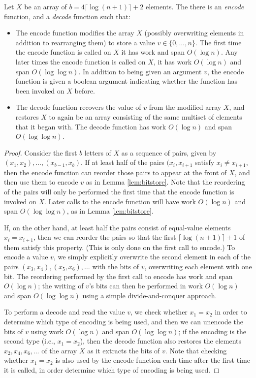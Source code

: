 \documentclass[twoside,leqno,twocolumn]{article}
\begin{document}
\begin{lemma}
Let $X$ be an array of $b = 4 \lceil \log (n + 1) \rceil + 2$
elements. The there is an \textit{encode} function, and a \textit{decode}
function such that:
\begin{itemize}
\item The encode function modifies the array $X$ (possibly overwriting
  elements in addition to rearranging them) to store a value $v \in
  \{0, \ldots, n\}$. The first time the encode function is called on
  $X$ it has work and span $O(\log n)$. Any later times the encode
  function is called on $X$, it has work $O(\log n)$ and span $O(\log
  \log n)$. In addition to being given an argument $v$, the encode
  function is given a boolean argument indicating whether the function
  has been invoked on $X$ before.
\item The decode function recovers the value of $v$ from the modified
  array $X$, and restores $X$ to again be an array consisting of the
  same multiset of elements that it began with. The decode function
  has work $O(\log n)$ and span $O(\log \log n)$.
\end{itemize}
  \label{lem:bitstore2}
\end{lemma}
\begin{proof}
Consider the first $b$ letters of $X$ as a sequence of pairs, given by
$(x_1, x_2), \ldots, (x_{b - 1}, x_b)$. If at least half of the pairs
$(x_i, x_{i + 1}$ satisfy $x_i \neq x_{i + 1}$, then the encode
function can reorder those pairs to appear at the front of $X$, and
then use them to encode $v$ as in Lemma \ref{lem:bitstore}. Note that
the reordering of the pairs will only be performed the first time that
the encode function is invoked on $X$. Later calls to the encode
function will have work $O(\log n)$ and span $O(\log \log n)$, as in
Lemma \ref{lem:bitstore}.

If, on the other hand, at least half the pairs consist of equal-value
elements $x_i = x_{i + 1}$, then we can reorder the pairs so that the
first $\lceil \log (n + 1) \rceil + 1$ of them satisfy this
property. (This is only done on the first call to encode.) To encode a
value $v$, we simply explicitly overwrite the second element in each
of the pairs $(x_3, x_4), (x_5, x_6), \ldots$ with the bits of $v$,
overwriting each element with one bit. The reordering performed by the
first call to encode has work and span $O(\log n)$; the writing of
$v$'s bits can then be performed in work $O(\log n)$ and span $O(\log
\log n)$ using a simple divide-and-conquer approach.

To perform a decode and read the value $v$, we check whether $x_1 =
x_2$ in order to determine which type of encoding is being used, and
then we can unencode the bits of $v$ using work $O(\log n)$ and span
$O(\log \log n)$; if the encoding is the second type (i.e., $x_1 =
x_2$), then the decode function also restores the elements $x_2, x_4,
x_6, \ldots$ of the array $X$ as it extracts the bits of $v$. Note
that checking whether $x_1 = x_2$ is also used by the encode function
each time after the first time it is called, in order determine which
type of encoding is being used.
\end{proof}
\end{document}
